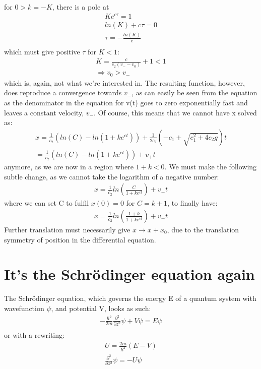 \documentclass[english,a4paper,oneside,article,9pt]{memoir}
\begin{document}
for $0>k=-K$, there is a pole at
\begin{align*}
Ke^{c\tau}=1\\
ln(K)+c\tau=0\\
\tau=-\frac{ln(K)}{c}\\
\end{align*}
which must give positive $\tau$ for $K<1$:
\begin{align*}
K=\frac{c}{c_2(v_--v_0)}+1<1\\
\Rightarrow v_0>v_-
\end{align*}
which is, again, not what we're interested in. The resulting function, however, does reproduce a convergence towards $v_-$, as can easily be seen from the equation as the denominator in the equation for v(t) goes to zero exponentially fast and leaves a constant velocity, $v_-$.
Of course, this means that we cannot have x solved as:
\begin{align*}
x=\frac{1}{c_2}(ln(C)-ln(1+ke^{ct}))+\frac{1}{2c_2}(-c_1+\sqrt{c_1^2+4c_2g})t\\
=\frac{1}{c_2}(ln(C)-ln(1+ke^{ct}))+v_+t
\end{align*}
anymore, as we are now in a region where $1+k<0$. We must make the following subtle change, as we cannot take the logarithm of a negative number:
\begin{align*}
x=\frac{1}{c_2}ln(\frac{C}{1+ke^{ct}})+v_+t
\end{align*}
where we can set C to fulfil $x(0)=0$ for $C=k+1$, to finally have:
\begin{align*}
x=\frac{1}{c_2}ln(\frac{1+k}{1+ke^{ct}})+v_+t
\end{align*}
Further translation must necessarily give $x\rightarrow x+x_0$, due to the translation symmetry of position in the differential equation.


\chapter{It's the Schrödinger equation again}
The Schrödinger equation, which governs the energy E of a quantum system with wavefunction $\psi$, and potential V, looks as such:
\begin{align*}
-\frac{\hbar^2}{2m}\frac{\partial^2}{\partial z^2}\psi+V\psi=E\psi\\
\end{align*}
or with a rewriting:
\begin{align*}
U=\frac{2m}{\hbar^2}(E-V)\\
\frac{\partial^2}{\partial z^2}\psi=-U\psi
\end{align*}
\end{document}

